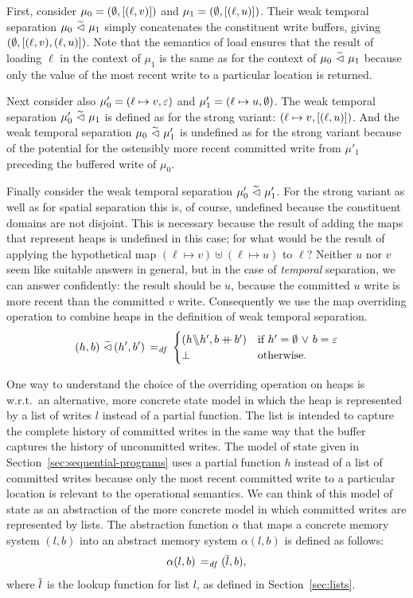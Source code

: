 \documentclass[11pt]{report}         %
\begin{document}
First, consider $\mu_0 = (\operatorname{\emptyset},\left[(\ell,v)\right])$ and $\mu_1 = (\operatorname{\emptyset},\left[(\ell,u)\right])$. Their weak temporal separation $\mu_0 \operatorname{\,\widetilde{\vartriangleleft}\,} \mu_1$ simply concatenates the constituent write buffers, giving $(\operatorname{\emptyset},\left[(\ell,v),(\ell,u)\right])$. Note that the semantics of load ensures that the result of loading $\ell$ in the context of $\mu_1$ is the same as for the context of $\mu_0 \operatorname{\,\widetilde{\vartriangleleft}\,} \mu_1$ because only the value of the most recent write to a particular location is returned. 

Next consider also $\mu'_0 = (\ell \mapsto v,\varepsilon)$ and $\mu'_1 = (\ell \mapsto u, \operatorname{\emptyset})$. The weak temporal separation $\mu'_0 \operatorname{\,\widetilde{\vartriangleleft}\,} \mu_1$ is defined as for the strong variant: $(\ell \mapsto v, \left[(\ell,u)\right])$. And the weak temporal separation $\mu_0 \operatorname{\,\widetilde{\vartriangleleft}\,} \mu'_1$ is undefined as for the strong variant because of the potential for the ostensibly more recent committed write from $\mu'_1$ preceding the buffered write of $\mu_0$. 

Finally consider the weak temporal separation $\mu'_0 \operatorname{\,\widetilde{\vartriangleleft}\,} \mu'_1$. For the strong variant as well as for spatial separation this is, of course, undefined because the constituent domains are not disjoint. This is necessary because the result of adding the maps that represent heaps is  undefined in this case; for what would be the result of applying the hypothetical map $(\ell \mapsto v) \uplus (\ell \mapsto u)$ to $\ell$? Neither $u$ nor $v$ seem like suitable answers in general, but in the case of \emph{temporal} separation, we can answer confidently: the result should be $u$, because the committed $u$ write is more recent than the committed $v$ write. Consequently we use the map overriding operation to combine heaps in the definition of weak temporal separation. 
\[ (h,b) \operatorname{\,\widetilde{\vartriangleleft}\,} (h',b') \operatorname{\;=_{\mathit{df}}\;} \begin{cases}
(h \backslash\!\!\backslash h', b \operatorname{+\!\!\!+} b') & \text{if $h' = \operatorname{\emptyset} \operatorname{\,\vee\,} b = \varepsilon$} \\
\bot & \text{otherwise.}
\end{cases}\]

One way to understand the choice of the overriding operation on heaps is w.r.t.\ an alternative, more concrete state model in which the heap is represented by a list of writes $l$ instead of a partial function. The list is intended to capture the complete history of committed writes in the same way that the buffer captures the history of uncommitted writes. The model of state given in Section~\ref{sec:sequential-programs} uses a partial function $h$ instead of a list of committed writes because only the most recent committed write to a particular location is relevant to the operational semantics. We can think of this model of state as an abstraction of the more concrete model in which committed writes are represented by lists. The abstraction function $\alpha$ that maps a concrete memory system $(l,b)$ into an abstract memory system $\alpha(l,b)$ is defined as follows:  \[ \alpha(l,b) \operatorname{\;=_{\mathit{df}}\;} (\overline{l},b),\] where $\overline{l}$ is the lookup function for list $l$, as defined in Section~\ref{sec:lists}. 
\end{document}
